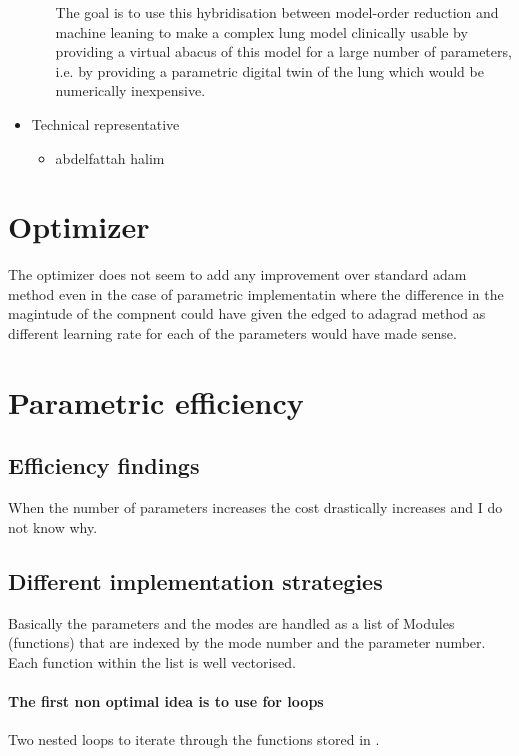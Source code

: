 \begin{itemize}
\begin{itemize}
The goal is to use this hybridisation between model-order reduction and machine leaning to make a complex lung model clinically usable by providing a virtual abacus of this model for a large number of parameters, i.e. by providing a parametric digital twin of the lung which would be numerically inexpensive.
     \end{itemize}
     \item Technical representative
     \begin{itemize}
         \item abdelfattah halim
     \end{itemize}
 \end{itemize}

\section{Optimizer}

The  optimizer does not seem to add any improvement over standard adam method even in the case of parametric implementatin where the difference in the magintude of the compnent could have given the edged to adagrad method as different learning rate for each of the parameters would have made sense.


\section{Parametric efficiency}

\subsection{Efficiency findings}
When the number of parameters increases the cost drastically increases and I do not know why. 


\subsection{Different implementation strategies}
Basically the parameters and the modes are handled as a list of Modules (functions) that are indexed by the mode number and the parameter number. Each function within the list is well vectorised.


\paragraph{The first non optimal idea is to use for loops}

Two nested loops to iterate through the functions stored in .

